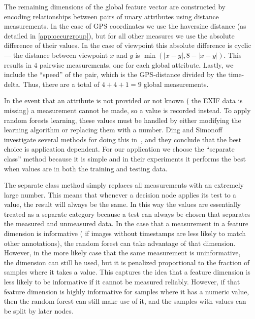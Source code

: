 The remaining dimensions of the global feature vector are constructed by encoding relationships between pairs of
  unary attributes using distance measurements.
In the case of GPS coordinates we use the haversine distance (as detailed in \cref{app:occurgroup}), but for all
  other measures we use the absolute difference of their values.
In the case of viewpoint this absolute difference is cyclic  --- \ie{} the distance between viewpoint $x$ and $y$
  is $\min(|x - y|, 8 - |x - y|)$.
This results in $4$ pairwise measurements, one for each global attribute.
Lastly, we include the ``speed'' of the pair, which is the GPS-distance divided by the time-delta.
Thus, there are a total of $4 + 4 + 1 = 9$ global measurements.

In the event that an attribute is not provided or not known (\eg{} the EXIF data is missing) a measurement cannot
be made, so a \nan{} value is recorded instead. To apply random forests learning, these \nan{} values must be
handled by either modifying the learning algorithm or replacing them with a number. Ding and Simonoff investigate
several methods for doing this in~\cite{ding_investigation_2010}, and they conclude that the best choice is
application dependent. For our application we choose the ``separate class'' method because it is simple and in
their experiments it performs the best when \nan{} values are in both the training and testing data.

The separate class method simply replaces all \nan{} measurements with an extremely large number.
This means that whenever a decision node applies its test to a \nan{} value, the result will always be the same.
In this way the \nan{} values are essentially treated as a separate category because a test can always be chosen
  that separates the measured and unmeasured data.
In the case that a \nan{} measurement in a feature dimension is informative (\eg{} if images without timestamps
  are less likely to match other annotations), the random forest can take advantage of that dimension.
However, in the more likely case that the same \nan{} measurement is uninformative, the dimension can still be
  used, but it is penalized proportional to the fraction of samples where it takes a \nan{} value.
This captures the idea that a feature dimension is less likely to be informative if it cannot be measured
  reliably.
However, if that feature dimension is highly informative for samples where it has a numeric value, then the
  random forest can still make use of it, and the samples with \nan{} values can be split by later nodes.

